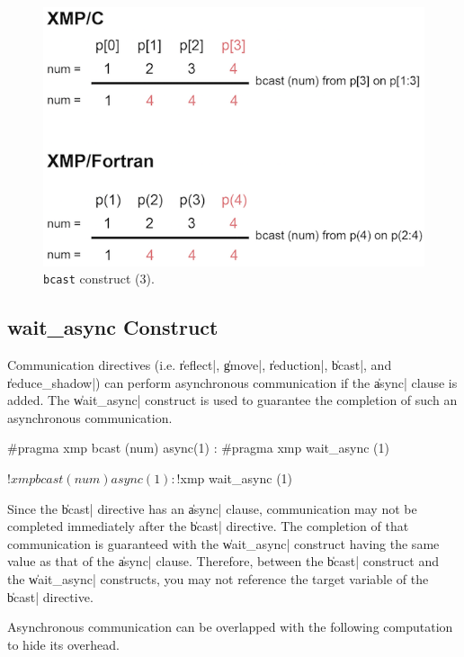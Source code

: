 \begin{figure}
  \centering
  \includegraphics{figs/bcast_from_on.png}
  \caption{{\tt bcast} construct (3).}
\end{figure}


\subsection{{\bf wait\_async} Construct}

Communication directives (i.e. \|reflect|, \|gmove|, \|reduction|,
\|bcast|, and \|reduce_shadow|) can perform asynchronous communication if
the \|async| clause is added. The \|wait_async| construct is used to
guarantee the completion of such an asynchronous communication.

\begin{XCexample}
#pragma xmp bcast (num) async(1)
    :
#pragma xmp wait_async (1)
\end{XCexample}

\begin{XFexample}
!$xmp bcast (num) async(1)
        :
!$xmp wait_async (1)
\end{XFexample}

Since the \|bcast| directive has an \|async| clause, communication may
not be completed immediately after the \|bcast| directive. The
completion of that communication is guaranteed with the \|wait_async|
construct having the same value as that of the \|async| clause.
%
Therefore, between the \|bcast| construct and the \|wait_async|
constructs, you may not reference the target variable of the \|bcast|
directive.

\begin{myhint}
  Asynchronous communication can be overlapped with the following
  computation to hide its overhead.
\end{myhint}

